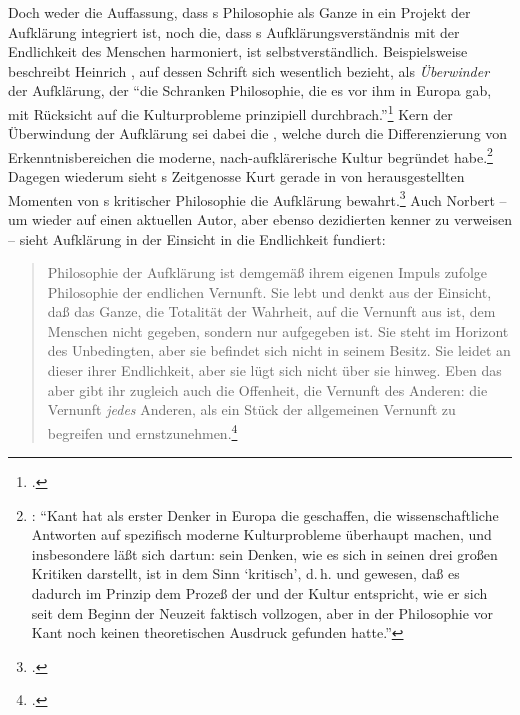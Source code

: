 Doch weder die Auffassung, dass s Philosophie als Ganze in ein
Projekt der Aufklärung integriert ist, noch die, dass s
Aufklärungsverständnis mit der Endlichkeit des Menschen harmoniert, ist
selbstverständlich. Beispielsweise beschreibt Heinrich ,
auf dessen Schrift  sich  wesentlich bezieht,
 als \emph{Überwinder} der Aufklärung, der \enquote{die
Schranken  Philosophie, die es vor ihm in Europa gab, mit Rücksicht auf die Kulturprobleme
prinzipiell
durchbrach.}\footnote{\cite[][140]{Rickert:KantalsPhilosophdermodernenKultur1924}.}
Kern der Überwindung der Aufklärung sei dabei die , welche durch die Differenzierung von Erkenntnisbereichen die moderne,
nach-aufklärerische Kultur begründet habe.\footnote{\cite[Vgl.][141]{Rickert:KantalsPhilosophdermodernenKultur1924}:
\enquote{Kant hat als erster Denker in Europa die  geschaffen, die wissenschaftliche Antworten auf spezifisch moderne
Kulturprobleme überhaupt  machen, und insbesondere läßt sich dartun: sein
Denken, wie es sich in seinen drei großen Kritiken darstellt, ist in dem Sinn
\enquote{kritisch}, d.\,h.  und  gewesen, daß es dadurch
im Prinzip dem Prozeß der  und  der Kultur
entspricht, wie er sich seit dem Beginn der Neuzeit faktisch vollzogen, aber in
der Philosophie vor Kant noch keinen theoretischen Ausdruck gefunden hatte.}}
Dagegen wiederum sieht s Zeitgenosse Kurt
 gerade in von  herausgestellten
Momenten von s kritischer Philosophie die Aufklärung
bewahrt.\footcite[Vgl.][]{Sternberg:AufklaerungKlassizismusundRomantikbeiKant1931}
Auch Norbert  -- um wieder auf einen aktuellen Autor, aber
ebenso dezidierten kenner zu verweisen -- sieht Aufklärung
in der Einsicht
in die Endlichkeit fundiert:
\begin{quote}
  Philosophie der Aufklärung ist demgemäß ihrem eigenen Impuls zufolge
  Philosophie der endlichen Vernunft. Sie lebt und denkt aus der Einsicht, daß
  das Ganze, die Totalität der Wahrheit, auf die Vernunft aus ist, dem Menschen
  nicht gegeben, sondern nur aufgegeben ist. Sie steht im Horizont des
  Unbedingten, aber sie befindet sich nicht in seinem Besitz. Sie leidet an
  dieser ihrer Endlichkeit, aber sie lügt sich nicht über sie hinweg. Eben das
  aber gibt ihr zugleich auch die Offenheit, die Vernunft des Anderen: die
  Vernunft \emph{jedes} Anderen, als ein Stück der allgemeinen Vernunft zu begreifen
  und
  ernstzunehmen.\footnote{\cite[][38]{Hinske:KantalsHerausforderungandieGegenwart1980}.}
\end{quote}
